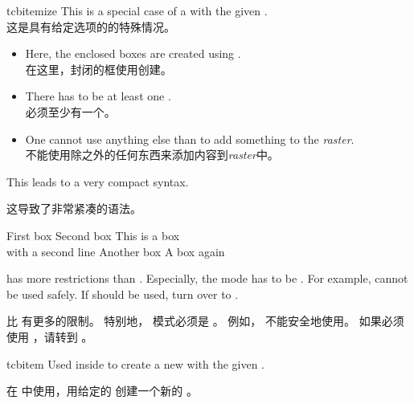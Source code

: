 \begin{docEnvironment}[doc new=2014-11-10]{tcbitemize}{}
This is a special case of a  with the given .
\\这是具有给定选项的的特殊情况。
\begin{itemize}
\item Here, the enclosed boxes are created using .
\\在这里，封闭的框使用创建。
\item There has to be at least one .
\\必须至少有一个。
\item One cannot use anything else than  to add something
to the \emph{raster}.
\\不能使用除之外的任何东西来添加内容到\emph{raster}中。
\end{itemize}
This leads to a very compact syntax.

这导致了非常紧凑的语法。

\begin{dispExample}
\begin{tcbitemize}[raster columns=2, raster equal height=rows,
size=small,colframe=red!50!black,colback=red!10!white,colbacktitle=red!50!white,
title={Box \# \thetcbrasternum}]
\tcbitem First box
\tcbitem Second box
\tcbitem This is a box\\with a second line
\tcbitem[colback=yellow,colbacktitle=yellow!50!black] Another box
\tcbitem A box again
\end{tcbitemize}
\end{dispExample}

\begin{marker}
 has more restrictions than .
Especially, the  mode has to be .
For example,  cannot be used safely.
If  should be used, turn over to .

 比  有更多的限制。 特别地， 模式必须是 。 例如， 不能安全地使用。 如果必须使用 ，请转到 。
\end{marker}
\end{docEnvironment}


\begin{docCommand}[doc new=2014-11-10]{tcbitem}{}
Used inside  to create a new 
with the given .

在  中使用，用给定的  创建一个新的 。
\end{docCommand}


